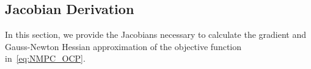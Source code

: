 


\subsection{Jacobian Derivation} \label{Jacobians}
In this section, we provide the Jacobians necessary to calculate the gradient and Gauss-Newton Hessian approximation of the objective function in~\eqref{eq:NMPC_OCP}.

